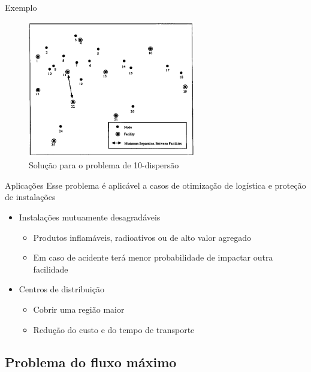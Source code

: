 \documentclass{beamer}
\newenvironment{outeritemize}{\begin{itemize}}{\end{itemize}\vspace{12pt}}
\begin{document}
\begin{frame}{Exemplo}
\begin{figure}[10-dispersion]
    \centering
    \includegraphics[width=0.65\textwidth]{assets/PDispersao/10-dispersion.png}
    \caption{Solução para o problema de 10-dispersão}
    \label{fig:10-dispersion}
\end{figure}  
\end{frame}

\begin{frame}{Aplicações}
\qquad Esse problema é aplicável a casos de otimização de logística e proteção de instalações
\vspace{0.3cm}
\begin{outeritemize}
\item Instalações mutuamente desagradáveis
    \begin{itemize}
        \item Produtos inflamáveis, radioativos ou de alto valor agregado
        \vspace{0.1cm}
        \item Em caso de acidente terá menor probabilidade de impactar outra facilidade
    \end{itemize}
\item Centros de distribuição 
    \begin{itemize}
        \item Cobrir uma região maior 
        \vspace{0.1cm}
        \item Redução do custo e do tempo de transporte 
    \end{itemize}
\end{outeritemize}
\end{frame}

\subsection{Problema do fluxo máximo}
\end{document}
